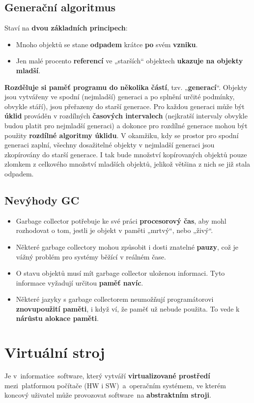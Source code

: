 \subsection{Generační algoritmus}
Staví na \textbf{dvou základních principech}:
\begin{itemize}
    \item Mnoho objektů se stane \textbf{odpadem} krátce \textbf{po} svém \textbf{vzniku}.
    \item Jen malé procento \textbf{referencí} ve „starších“ objektech \textbf{ukazuje na objekty mladší}.
\end{itemize}
\textbf{Rozděluje si paměť programu do několika částí}, tzv. „\textbf{generací}“. Objekty jsou vytvářeny ve spodní (nejmladší) generaci a po splnění určité podmínky, obvykle stáří), jsou přeřazeny do starší generace. Pro každou generaci může být \textbf{úklid} prováděn v rozdílných \textbf{časových intervalech }(nejkratší intervaly obvykle budou platit pro nejmladší generaci) a dokonce pro rozdílné generace mohou být použity \textbf{rozdílné algoritmy úklidu}. V okamžiku, kdy se prostor pro spodní generaci zaplní, všechny dosažitelné objekty v nejmladší generaci jsou zkopírovány do starší generace. I tak bude množství kopírovaných objektů pouze zlomkem z celkového množství mladších objektů, jelikož většina z nich se již stala odpadem.

\subsection{Nevýhody GC}
\begin{itemize}
    \item Garbage collector potřebuje ke své práci \textbf{procesorový čas}, aby mohl rozhodovat o tom, jestli je objekt v paměti „mrtvý“, nebo „živý“.
    \item Některé garbage collectory mohou způsobit i dosti znatelné \textbf{pauzy}, což je vážný problém pro systémy běžící v reálném čase.
    \item O stavu objektů musí mít garbage collector uloženou informaci. Tyto informace vyžadují určitou \textbf{paměť navíc}.
    \item Některé jazyky s garbage collectorem neumožňují programátorovi \textbf{znovupoužití paměti}, i když ví, že paměť už nebude použita. To vede k \textbf{nárůstu alokace paměti}.
\end{itemize}

\section{Virtuální stroj}
Je v informatice software, který vytváří \textbf{virtualizované prostředí} mezi platformou počítače (HW i SW) a operačním systémem, ve kterém koncový uživatel může provozovat software na \textbf{abstraktním stroji}.

